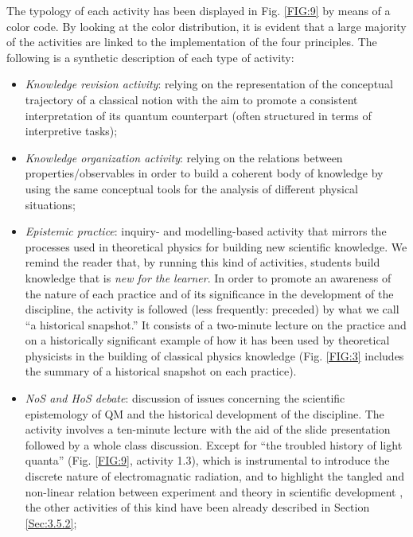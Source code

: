 \documentclass[twocolumn,secnumarabic,amssymb, nobibnotes, aps, prd, nofootinbib]{revtex4-2}
\begin{document}
The typology of each activity has been displayed in Fig. \ref{FIG:9} by means of a color code. By looking at the color distribution, it is evident that a large majority of the activities are linked to the implementation of the four principles. The following is a synthetic description of each type of activity:
\begin{itemize}
    \item \textit{Knowledge revision activity}: relying on the representation of the conceptual trajectory of a classical notion \cite{Zuccarini2022} with the aim to promote a consistent interpretation of its quantum counterpart (often structured in terms of interpretive tasks);
    \item \textit{Knowledge organization activity}: relying on the relations between properties/observables in order to build a coherent body of knowledge by using the same conceptual tools for the analysis of different physical situations;
    \item \textit{Epistemic practice}: inquiry- and modelling-based activity that mirrors the processes used in theoretical physics for building new scientific knowledge. We remind the reader that, by running this kind of activities, students build knowledge that is \emph{new for the learner}. In order to promote an awareness of the nature of each practice and of its significance in the development of the discipline, the activity is followed (less frequently: preceded) by what we call ``a historical snapshot.'' It consists of a two-minute lecture on the practice and on a historically significant example of how it has been used by theoretical physicists in the building of classical physics knowledge (Fig. \ref{FIG:3} includes the summary of a historical snapshot on each practice).
    \item \textit{NoS and HoS debate}:  discussion of issues concerning the scientific epistemology of QM and the historical development of the discipline. The activity involves a ten-minute lecture with the aid of the slide presentation followed by a whole class discussion. Except for ``the troubled history of light quanta'' (Fig. \ref{FIG:9}, activity 1.3), which is instrumental to introduce the discrete nature of electromagnatic radiation, and to highlight the tangled and non-linear relation between experiment and theory in scientific development \cite{Kragh1992}, the other activities of this kind have been already described in Section \ref{Sec:3.5.2};

\end{itemize}
\end{document}
